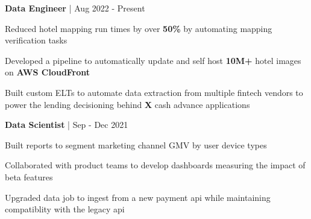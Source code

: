 


\begin{cventries}

\cventry
{\textbf{Data Engineer} | \color{awesome}{Super}}
{Aug 2022 - Present} %
{ %
\begin{cvitems}
\item {Reduced hotel mapping run times by over \textbf{50\%} by automating mapping verification tasks}
\item {Developed a pipeline to automatically update and self host \textbf{10M+} hotel images on \textbf{AWS CloudFront}}
\item {Built custom ELTs to automate data extraction from multiple fintech vendors to power the lending decisioning behind \textbf{X} cash advance applications}
\end{cvitems}
}

\cventry
{\textbf{Data Scientist} | \color{awesome}{Shopify}}
{Sep - Dec 2021} %
{ %
\begin{cvitems}
\item {Built reports to segment marketing channel GMV by user device types}
\item {Collaborated with product teams to develop dashboards measuring the impact of beta features}
\item {Upgraded data job to ingest from a new payment api while maintaining compatiblity with the legacy api}
\end{cvitems}
}


\end{cventries}
